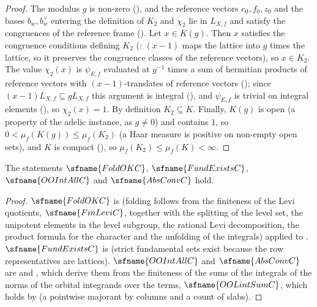 \begin{proof}
The modulus $g$ is non-zero (), and the reference vectors
$e_0,f_0,z_0$ and the bases $b_w,b_w^\vee$ entering the definition of $K_2$ and $\chi_2$ lie in $L_{X,f}$ and satisfy the
congruences of the reference frame (). Let $x\in K(g)$. Then
$x$ satisfies the congruence conditions defining $K_2$ (: $(x-1)$ maps the lattice
into $g$ times the lattice, so it preserves the congruence classes of the reference vectors), so $x\in K_2$. The value
$\chi_2(x)$ is $\psi_{E,f}$ evaluated at $g^{-1}$ times a sum of hermitian products of reference vectors with
$(x-1)$-translates of reference vectors (); since
$(x-1)L_{X,f}\subseteq gL_{X,f}$ this argument is integral (), and $\psi_{E,f}$ is
trivial on integral elements (), so $\chi_2(x)=1$. By definition $K_2\subseteq K$.
Finally, $K(g)$ is open (a property of the adelic instance, as $g\ne0$) and contains $1$, so
$0<\mu_f(K(g))\le\mu_f(K_2)$ (a Haar measure is positive on non-empty open sets), and $K$ is compact
(), so $\mu_f(K_2)\le\mu_f(K)<\infty$.
\end{proof}

\begin{proposition}\label{pf:sh-siegel:closed4}
The statements $\sfname{FoldOKC}$, $\sfname{FundExistsC}$, $\sfname{OOIntAllC}$ and $\sfname{AbsConvC}$ hold.
\end{proposition}

\begin{proof}
$\sfname{FoldOKC}$ is  (folding follows from the finiteness of the
Levi quotients, $\sfname{FinLeviC}$, together with the splitting of the level set, the unipotent elements in the level
subgroup, the rational Levi decomposition, the product formula for the character and the unfolding of the integrals)
applied to . $\sfname{FundExistsC}$ is
 (strict fundamental sets exist because the row representatives are
lattices). $\sfname{OOIntAllC}$ and $\sfname{AbsConvC}$ are  and
, which derive them from the finiteness of the sums of the integrals of the
norms of the orbital integrands over the terms, $\sfname{OOLintSumC}$, which holds by
 (a pointwise majorant by columns and a count of slabs).
\end{proof}


